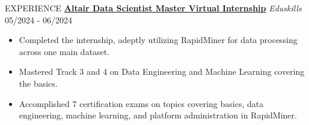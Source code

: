 \documentclass{resume} %
\begin{document}
\begin{rSection}{EXPERIENCE}
\textbf{\href{https://drive.google.com/drive/folders/1zJUxf5e83R8e-LNZSDJIef5HuBml4bJN?usp=drive_link}{Altair Data Scientist Master Virtual Internship}} \textit{Eduskills} \hfill 05/2024 - 06/2024 
\vspace{-0.6em}
\begin{itemize}
    \setlength\itemsep{-0.6em} %
    \item Completed the internship, adeptly utilizing RapidMiner for data processing across one main dataset.
    \item Mastered Track 3 and 4 on Data Engineering and Machine Learning covering the basics.
    \item Accomplished 7 certification exams on topics covering basics, data engineering, machine learning, and platform administration in RapidMiner.
\end{itemize}

\end{rSection}
\end{document}
